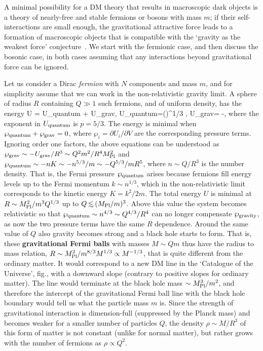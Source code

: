 A minimal possibility for a DM theory that results in macroscopic dark objects
is a theory of nearly-free and stable fermions or bosons with mass $m$;
if their self-interactions are small enough, the gravitational attractive force leads to a formation of macroscopic objects that is
compatible with the `gravity as the weakest force' conjecture~\cite{SwamplandDM}.
We start with the fermionic case, and then discuss the bosonic case, in both cases assuming that any interactions beyond gravitational force can be ignored. 

\smallskip


Let us consider a Dirac {\em fermion} with $N$ components and mass $m$, and for simplicity assume that we can work in the non-relativistic gravity limit.
A sphere of radius $R$ containing $Q\gg 1$ such fermions, and of uniform density, has the energy
\beq \label{eq:Unr} 
U = U_{\rm quantum} + U_{\rm grav},\qquad
U_{\rm quantum}=\left(\right)^{1/3}
,
\qquad U_{\rm grav}= -,
 \eeq
where the exponent in $U_{\rm quantum}$ is $p=5/3$. 
The energy is minimal when $\wp_{\rm quantum} + \wp_{\rm grav}=0$,
where $\wp_i = \partial U_i/\partial V$ are the corresponding pressure terms.
Ignoring order one factors, the above equations can be understood
as $ \wp_{\rm grav} \sim  -U_{\rm grav}/R^3 \sim  Q^2 m^2/R^4 M_{\rm Pl}^2$
and  $\wp_{\rm quantum} \sim -n K\sim - n^{5/3}/m \sim - Q^{5/3}/mR^5 $,
where $n\sim Q/R^3 $ is the number density. 
That is, the Fermi pressure $\wp_{\rm quantum}$ arises because fermions 
fill energy levels up to the
Fermi momentum $k \sim   n^{1/3}$, which in the non-relativistic limit corresponds to the kinetic energy $K=k^2/2m$.
The total energy $U$ is minimal at $R \sim M_{\rm Pl}^2/m^3Q^{1/3}$ 
up to $Q\circa{<} (M_{\rm Pl}/m)^3$.
Above this value the system becomes relativistic
so that $\wp_{\rm quantum} \sim n^{4/3} \sim Q^{4/3}/R^4$
can no longer compensate  $\wp_{\rm gravity}$, as now the two pressure terms have the same $R$ dependence. 
Around the same value of $Q$ also gravity becomes strong and  a black hole starts to form.
That is, these {\bf gravitational Fermi balls} with masses 
$M\sim Q m$ thus have the radius to mass relation,
$R \sim M_{\rm Pl}^2/m^{8/3}M^{1/3} \propto M^{-1/3}$,
 that is quite different from the ordinary matter. 
 It would correspond to a new DM line  in the `Catalogue of the Universe', fig., 
with a downward slope (contrary to positive slopes for ordinary matter). The line would terminate at the black hole mass $\sim M_{\rm Pl}^3/m^2$, and therefore 
the intercept of the gravitational Fermi ball line with the black hole boundary would tell us what the particle mass $m$ is.
Since the strength of gravitational interaction is dimension-full (suppressed by the Planck mass)
and becomes weaker for a smaller number of particles $Q$,
the density $\rho\sim M/R^3$ of this form of matter is not constant (unlike for normal matter), but rather grows with the number of fermions as $\rho\propto Q^{2}$.

